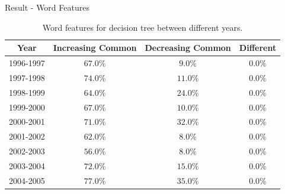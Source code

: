\documentclass{beamer}
\begin{document}
\begin{frame}{Result - Word Features}

  \begin{table}[H]
    \centering
    \begin{tabular}{|c|c|c|c|}
      \hline
      Year      & Increasing Common & Decreasing Common & Different \\
      \hline
      1996-1997 & $67.0\%$          & $9.0\%$           & $0.0\%$   \\
      \hline
      1997-1998 & $74.0\%$          & $11.0\%$          & $0.0\%$   \\
      \hline
      1998-1999 & $64.0\%$          & $24.0\%$          & $0.0\%$   \\
      \hline
      1999-2000 & $67.0\%$          & $10.0\%$          & $0.0\%$   \\
      \hline
      2000-2001 & $71.0\%$          & $32.0\%$          & $0.0\%$   \\
      \hline
      2001-2002 & $62.0\%$          & $8.0\%$           & $0.0\%$   \\
      \hline
      2002-2003 & $56.0\%$          & $8.0\%$           & $0.0\%$   \\
      \hline
      2003-2004 & $72.0\%$          & $15.0\%$          & $0.0\%$   \\
      \hline
      2004-2005 & $77.0\%$          & $35.0\%$          & $0.0\%$   \\
      \hline
    \end{tabular}
    \caption{Word features for decision tree between different years.}
  \end{table}

\end{frame}
\end{document}
